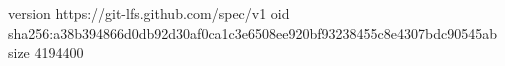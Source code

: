 version https://git-lfs.github.com/spec/v1
oid sha256:a38b394866d0db92d30af0ca1c3e6508ee920bf93238455c8e4307bdc90545ab
size 4194400
